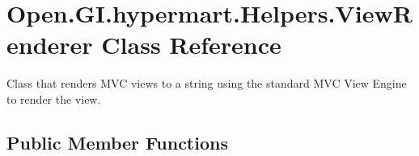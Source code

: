 \hypertarget{class_open_1_1_g_i_1_1hypermart_1_1_helpers_1_1_view_renderer}{}\section{Open.\+G\+I.\+hypermart.\+Helpers.\+View\+Renderer Class Reference}
\label{class_open_1_1_g_i_1_1hypermart_1_1_helpers_1_1_view_renderer}


Class that renders M\+VC views to a string using the standard M\+VC View Engine to render the view.  


\subsection*{Public Member Functions}

